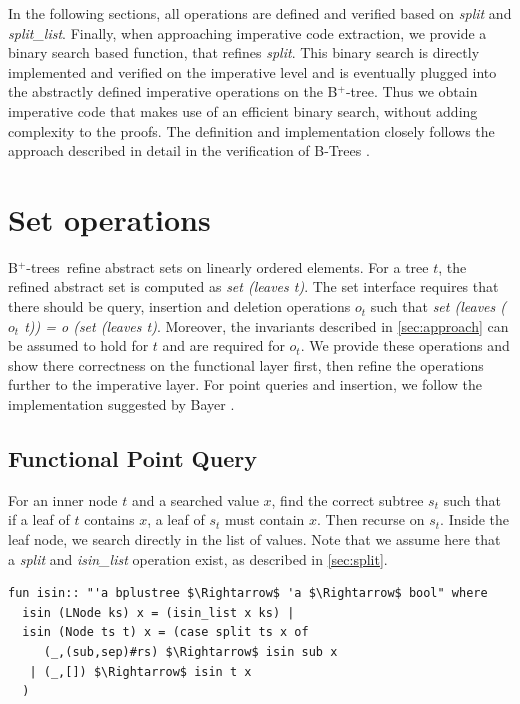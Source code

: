 \documentclass[a4paper,UKenglish,cleveref, autoref, thm-restate]{lipics-v2021}
\newcommand{\btree}{B$^+$-tree}
\newcommand{\btrees}{B$^+$-trees}
\begin{document}
In the following sections, all operations are defined and verified
based on \emph{split} and \emph{split\_list}.
Finally, when approaching imperative code extraction,
we provide a binary search based function, that refines \emph{split}.
This binary search is directly implemented and verified on the imperative
level and is eventually plugged into the abstractly defined
imperative operations on the \btree.
Thus we obtain imperative code that makes use of an efficient
binary search, without adding complexity to the proofs.
The definition and implementation closely follows
the approach described in detail in the
verification of B-Trees \cite{DBLP:journals/afp/Mundler21}.


\section{Set operations}
\label{sec:set}

\btrees\ refine abstract sets on linearly ordered elements.
For a tree $t$, the refined abstract set is computed as \emph{set (leaves t)}.
The set interface requires that there should be query, insertion and deletion
operations $o_t$ such that \emph{set (leaves ($o_t$ t)) = o (set (leaves t)}.
Moreover, the invariants described in \autoref{sec:approach}
can be assumed to hold for $t$ and are required for $o_t$.
We provide these operations and show there correctness on the functional
layer first, then refine the operations further to the imperative
layer.
For point queries and insertion, we follow the implementation
suggested by Bayer \cite{DBLP:journals/acta/BayerM72}.

\subsection{Functional Point Query}
\label{sec:functional_pq}

For an inner node $t$ and a searched value $x$, find the correct subtree $s_t$
such that if a leaf of $t$ contains $x$, a leaf of $s_t$ must contain $x$.
Then recurse on $s_t$.
Inside the leaf node, we search directly in the list of values.
Note that we assume here that a \textit{split} and \textit{isin\_list} operation exist,
as described in \autoref{sec:split}.

\begin{lstlisting}[mathescape=true, language=Isabelle,label=lst:isin-def]
fun isin:: "'a bplustree $\Rightarrow$ 'a $\Rightarrow$ bool" where
  isin (LNode ks) x = (isin_list x ks) |
  isin (Node ts t) x = (case split ts x of
     (_,(sub,sep)#rs) $\Rightarrow$ isin sub x
   | (_,[]) $\Rightarrow$ isin t x
  )
\end{lstlisting}
\end{document}
